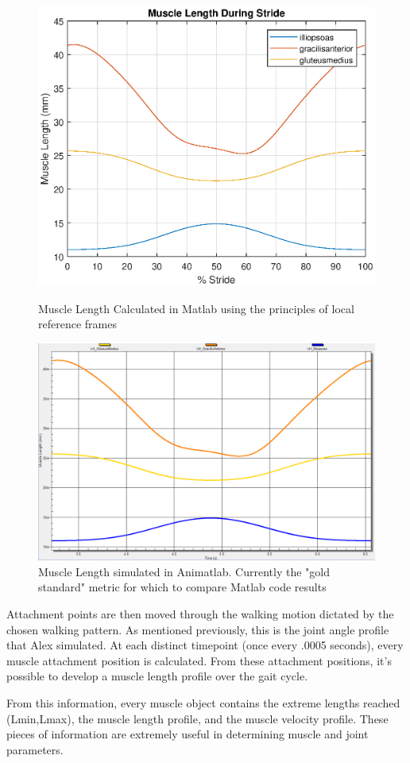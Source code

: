 \documentclass[runningheads,a4paper]{llncs}
\begin{document}
			\begin{figure}
				\centering
				\begin{minipage}{0.48\textwidth}
					\centering
					\includegraphics[width=\textwidth]{musc2.eps}
					\caption{Muscle Length Calculated in Matlab using the principles of local reference frames}
				\end{minipage}\hfill
				\begin{minipage}{0.48\textwidth}
					\centering
					\includegraphics[width=\textwidth]{musc3.PNG}
					\caption{Muscle Length simulated in Animatlab. Currently the "gold standard" metric for which to compare Matlab code results}
				\end{minipage}
			\end{figure}
	Attachment points are then moved through the walking motion dictated by the chosen walking pattern. As mentioned previously, this is the joint angle profile that Alex simulated. At each distinct timepoint (once every .0005 seconds), every muscle attachment position is calculated. From these attachment positions, it’s possible to develop a muscle length profile over the gait cycle. \par
	From this information, every muscle object contains the extreme lengths reached (L{\scriptsize min},L{\scriptsize max}), the muscle length profile, and the muscle velocity profile. These pieces of information are extremely useful in determining muscle and joint parameters. \par
	
\end{document}
